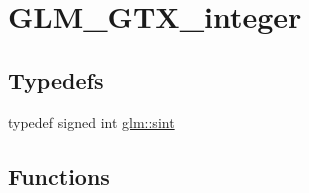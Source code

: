 \hypertarget{group__gtx__integer}{}\section{G\+L\+M\+\_\+\+G\+T\+X\+\_\+integer}
\label{group__gtx__integer}
\subsection*{Typedefs}
\begin{DoxyCompactItemize}
\item 
typedef signed int \hyperlink{group__gtx__integer_ga73643e09d8c6d362418aec541fdb987d}{glm\+::sint}
\end{DoxyCompactItemize}
\subsection*{Functions}
